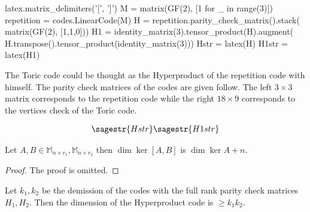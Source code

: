 
\begin{sagesilent}
latex.matrix_delimiters('[', ']')
M = matrix(GF(2), [1 for _ in range(3)])
repetition = codes.LinearCode(M)
H = repetition.parity_check_matrix().stack( matrix(GF(2), [1,1,0]))
H1 = identity_matrix(3).tensor_product(H).augment( H.transpose().tensor_product(identity_matrix(3)))
Hstr = latex(H)
H1str = latex(H1)
\end{sagesilent}

\begin{example}
  The Toric code could be thought as the Hyperproduct of the repetition code with himself. The parity check matrices of the codes are given follow. The left $3 \times 3$ matrix corresponds to the repetition code while the right $18 \times  9$ corresponds to the vertices check of the Toric code.  
\end{example}

\begin{equation*}
  \begin{split}
    \sagestr{Hstr} \sagestr{H1str} 
  \end{split}
\end{equation*}


\begin{claim}
  \label{claim:kerdim}
  Let  $A,B \in \mathbb{M}_{n\times r_{1}}, \mathbb{M}_{n\times r_{2}}$ then  $\dim \ker [A ,B]$ is $ \dim \ker A + n $. 
\end{claim}

\begin{proof}
  The proof is omitted. 
\end{proof}

\begin{claim}
  Let $k_{1},k_{2}$ be the demission of the codes with the full rank  parity check matrices $H_{1},H_{2}$. Then the dimension of the Hyperproduct code is $ \ge k_{1}k_{2}$. 
\end{claim}

